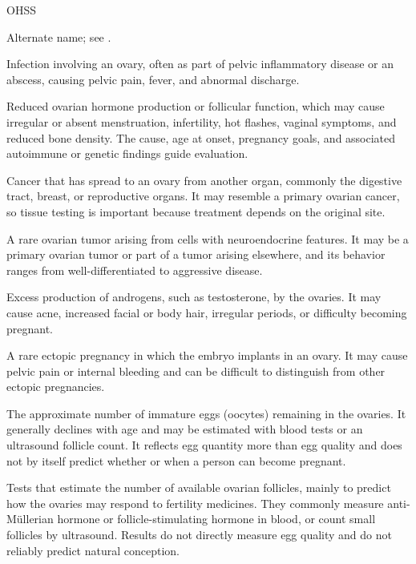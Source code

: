 \synonyms
OHSS

 Alternate name; see .

 Infection involving an ovary, often as part of pelvic inflammatory disease or an abscess, causing pelvic pain, fever, and abnormal discharge.

 Reduced ovarian hormone production or follicular function, which may cause irregular or absent menstruation, infertility, hot flashes, vaginal symptoms, and reduced bone density. The cause, age at onset, pregnancy goals, and associated autoimmune or genetic findings guide evaluation.

 Cancer that has spread to an ovary from another organ, commonly the digestive tract, breast, or reproductive organs. It may resemble a primary ovarian cancer, so tissue testing is important because treatment depends on the original site.

 A rare ovarian tumor arising from cells with neuroendocrine features. It may be a primary ovarian tumor or part of a tumor arising elsewhere, and its behavior ranges from well-differentiated to aggressive disease.

 Excess production of androgens, such as testosterone, by the ovaries. It may cause acne, increased facial or body hair, irregular periods, or difficulty becoming pregnant.

 A rare ectopic pregnancy in which the embryo implants in an ovary. It may cause pelvic pain or internal bleeding and can be difficult to distinguish from other ectopic pregnancies.

 The approximate number of immature eggs (oocytes) remaining in the ovaries. It generally declines with age and may be estimated with blood tests or an ultrasound follicle count. It reflects egg quantity more than egg quality and does not by itself predict whether or when a person can become pregnant.

 Tests that estimate the number of available ovarian follicles, mainly to predict how the ovaries may respond to fertility medicines. They commonly measure anti-Müllerian hormone or follicle-stimulating hormone in blood, or count small follicles by ultrasound. Results do not directly measure egg quality and do not reliably predict natural conception.

